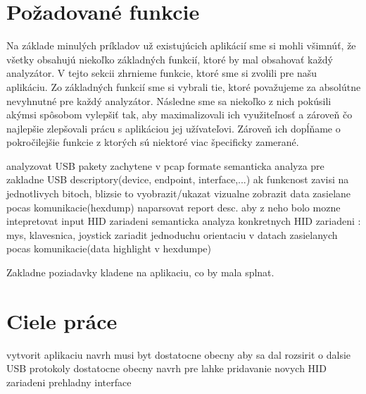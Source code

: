 \section{Požadované funkcie}
Na základe minulých príkladov už existujúcich aplikácií sme si mohli všimnúť, že všetky obsahujú niekoľko základných funkcií, ktoré by mal obsahovať každý analyzátor. V tejto sekcii zhrnieme funkcie, ktoré sme si zvolili pre našu aplikáciu. Zo základných funkcií sme si vybrali tie, ktoré považujeme za absolútne nevyhnutné pre každý analyzátor. Následne sme sa niekoľko z nich pokúsili akýmsi spôsobom vylepšiť tak, aby maximalizovali ich využiteľnosť a zároveň čo najlepšie zlepšovali prácu s aplikáciou jej užívateľovi. Zároveň ich dopĺňame o pokročilejšie funkcie z ktorých sú niektoré viac špecificky zamerané.

analyzovat USB pakety zachytene v pcap formate
semanticka analyza pre zakladne USB descriptory(device, endpoint, interface,...)
ak funkcnost zavisi na jednotlivych bitoch, blizsie to vyobrazit/ukazat
vizualne zobrazit data zasielane pocas komunikacie(hexdump)
naparsovat report desc. aby z neho bolo mozne intepretovat input HID zariadeni
semanticka analyza konkretnych HID zariadeni : mys, klavesnica, joystick
zariadit jednoduchu orientaciu v datach zasielanych pocas komunikacie(data highlight v hexdumpe)


Zakladne poziadavky kladene na aplikaciu, co by mala splnat.

\section{Ciele práce}
vytvorit aplikaciu
navrh musi byt dostatocne obecny aby sa dal rozsirit o dalsie USB protokoly
dostatocne obecny navrh pre lahke pridavanie novych HID zariadeni
prehladny interface







